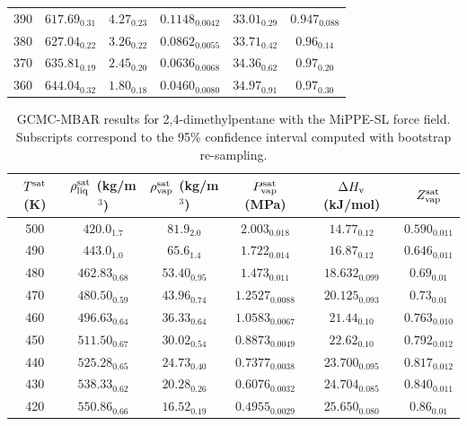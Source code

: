 \documentclass[journal=jctc,manuscript=article]{achemso}
\begin{document}
\begin{table}[htb!]
\begin{center}
\begin{tabular}{|c|c|c|c|c|c|}
			390 & $617.69_{0.31}$ & $4.27_{0.23}$ & $0.1148_{0.0042}$ & $33.01_{0.29}$ & $0.947_{0.088}$ \\
			380 & $627.04_{0.22}$ & $3.26_{0.22}$ & $0.0862_{0.0055}$ & $33.71_{0.42}$ & $0.96_{0.14}$ \\
			370 & $635.81_{0.19}$ & $2.45_{0.20}$ & $0.0636_{0.0068}$ & $34.36_{0.62}$ & $0.97_{0.20}$ \\
			360 & $644.04_{0.32}$ & $1.80_{0.18}$ & $0.0460_{0.0080}$ & $34.97_{0.91}$ & $0.97_{0.30}$ \\
			\hline
		\end{tabular}
	\end{center}
\end{table}

\begin{table}[htb!]
	\caption{GCMC-MBAR results for 2,4-dimethylpentane with the MiPPE-SL force field. Subscripts correspond to the 95\% confidence interval computed with bootstrap re-sampling.}
	\begin{center}
		\begin{tabular}{|c|c|c|c|c|c|}
			\hline
			$T^{\rm sat}$ (K) & $\rho_{\rm liq}^{\rm sat}$ (kg/m$^3$) & $\rho_{\rm vap}^{\rm sat}$ (kg/m$^3$) & $P_{\rm vap}^{\rm sat}$ (MPa) & $\Delta H_{\rm v}$ (kJ/mol) & $Z_{\rm vap}^{\rm sat}$ \\ \hline
			500 & $420.0_{1.7}$ & $81.9_{2.0}$ & $2.003_{0.018}$ & $14.77_{0.12}$ & $0.590_{0.011}$ \\
			490 & $443.0_{1.0}$ & $65.6_{1.4}$ & $1.722_{0.014}$ & $16.87_{0.12}$ & $0.646_{0.011}$ \\
			480 & $462.83_{0.68}$ & $53.40_{0.95}$ & $1.473_{0.011}$ & $18.632_{0.099}$ & $0.69_{0.01}$ \\
			470 & $480.50_{0.59}$ & $43.96_{0.74}$ & $1.2527_{0.0088}$ & $20.125_{0.093}$ & $0.73_{0.01}$ \\
			460 & $496.63_{0.64}$ & $36.33_{0.64}$ & $1.0583_{0.0067}$ & $21.44_{0.10}$ & $0.763_{0.010}$ \\
			450 & $511.50_{0.67}$ & $30.02_{0.54}$ & $0.8873_{0.0049}$ & $22.62_{0.10}$ & $0.792_{0.012}$ \\
			440 & $525.28_{0.65}$ & $24.73_{0.40}$ & $0.7377_{0.0038}$ & $23.700_{0.095}$ & $0.817_{0.012}$ \\
			430 & $538.33_{0.62}$ & $20.28_{0.26}$ & $0.6076_{0.0032}$ & $24.704_{0.085}$ & $0.840_{0.011}$ \\
			420 & $550.86_{0.66}$ & $16.52_{0.19}$ & $0.4955_{0.0029}$ & $25.650_{0.080}$ & $0.86_{0.01}$ \\

\end{tabular}
\end{center}
\end{table}
\end{document}
